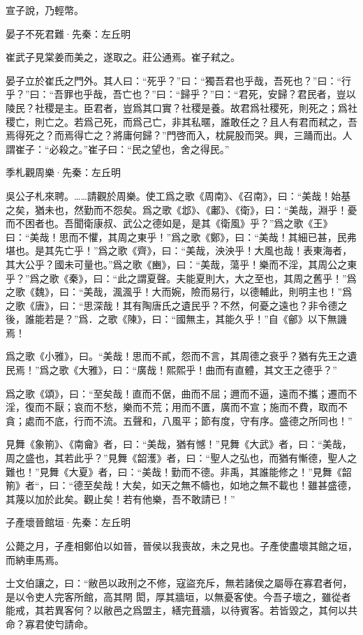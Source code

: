\documentclass[12pt,a4paper]{ctexbook}
\begin{document}
宣子說，乃輕幣。\par
晏子不死君難·先秦：左丘明 \par
崔武子見棠姜而美之，遂取之。莊公通焉。崔子弒之。\par
晏子立於崔氏之門外。其人曰：“死乎？”曰：“獨吾君也乎哉，吾死也？”曰：“行乎？”曰：“吾罪也乎哉，吾亡也？”曰：“歸乎？”曰：“君死，安歸？君民者，豈以陵民？社稷是主。臣君者，豈爲其口實？社稷是養。故君爲社稷死，則死之；爲社稷亡，則亡之。若爲己死，而爲己亡，非其私暱，誰敢任之？且人有君而弒之，吾焉得死之？而焉得亡之？將庸何歸？”門啓而入，枕屍股而哭。興，三踊而出。人謂崔子：“必殺之。”崔子曰：“民之望也，舍之得民。”\par
季札觀周樂·先秦：左丘明 \par
吳公子札來聘。……請觀於周樂。使工爲之歌《周南》、《召南》，曰：“美哉！始基之矣，猶未也，然勤而不怨矣。爲之歌《邶》、《鄘》、《衛》，曰：“美哉，淵乎！憂而不困者也。吾聞衛康叔、武公之德如是，是其《衛風》乎？”爲之歌《王》曰：“美哉！思而不懼，其周之東乎！”爲之歌《鄭》，曰：“美哉！其細已甚，民弗堪也。是其先亡乎！”爲之歌《齊》，曰：“美哉，泱泱乎！大風也哉！表東海者，其大公乎？國未可量也。”爲之歌《豳》，曰：“美哉，蕩乎！樂而不淫，其周公之東乎？”爲之歌《秦》，曰：“此之謂夏聲。夫能夏則大，大之至也，其周之舊乎！”爲之歌《魏》，曰：“美哉，渢渢乎！大而婉，險而易行，以德輔此，則明主也！”爲之歌《唐》，曰：“思深哉！其有陶唐氏之遺民乎？不然，何憂之遠也？非令德之後，誰能若是？”爲．之歌《陳》，曰：“國無主，其能久乎！”自《鄶》以下無譏焉！\par
爲之歌《小雅》，曰。“美哉！思而不貳，怨而不言，其周德之衰乎？猶有先王之遺民焉！”爲之歌《大雅》，曰：“廣哉！熙熙乎！曲而有直體，其文王之德乎？”\par
爲之歌《頌》，曰：“至矣哉！直而不倨，曲而不屈；邇而不逼，遠而不攜；遷而不淫，復而不厭；哀而不愁，樂而不荒；用而不匱，廣而不宣；施而不費，取而不貪；處而不底，行而不流。五聲和，八風平；節有度，守有序。盛德之所同也！”\par
見舞《象箾》、《南龠》者，曰：“美哉，猶有憾！”見舞《大武》者，曰：“美哉，周之盛也，其若此乎？”見舞《韶濩》者，曰：“聖人之弘也，而猶有慚德，聖人之難也！”見舞《大夏》者，曰：“美哉！勤而不德。非禹，其誰能修之！”見舞《韶箾》者“，曰：“德至矣哉！大矣，如天之無不幬也，如地之無不載也！雖甚盛德，其蔑以加於此矣。觀止矣！若有他樂，吾不敢請已！”\par
子產壞晉館垣·先秦：左丘明 \par
公薨之月，子產相鄭伯以如晉，晉侯以我喪故，未之見也。子產使盡壞其館之垣，而納車馬焉。\par
士文伯讓之，曰：“敝邑以政刑之不修，寇盜充斥，無若諸侯之屬辱在寡君者何，是以令吏人完客所館，高其閈 閎，厚其牆垣，以無憂客使。今吾子壞之，雖從者能戒，其若異客何？以敝邑之爲盟主，繕完葺牆，以待賓客。若皆毀之，其何以共命？寡君使匄請命。\par
\end{document}
